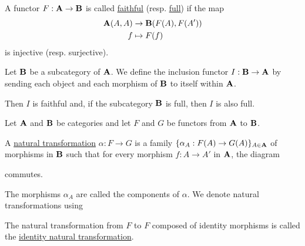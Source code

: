 \begin{definition}\label{def:faithful_full_functor}\cite[definition 1.2.16]{Leinster2014}
  A functor $F: \operatorname{\mathbf{A}} \to \operatorname{\mathbf{B}}$ is called \ul{faithful} (resp. \ul{full}) if the map
  \begin{align*}
    \operatorname{\mathbf{A}}(A, A) &\to \operatorname{\mathbf{B}}(F(A), F(A')) \\
    f &\mapsto F(f)
  \end{align*}
  is injective (resp. surjective).
\end{definition}

\begin{example}\label{def:subcategory_functors}\cite[25]{Leinster2014}
  Let $\operatorname{\mathbf{B}}$ be a subcategory of $\operatorname{\mathbf{A}}$. We define the inclusion functor $I: \operatorname{\mathbf{B}} \to \operatorname{\mathbf{A}}$ by sending each object and each morphism of $\operatorname{\mathbf{B}}$ to itself within $\operatorname{\mathbf{A}}$.

  Then $I$ is faithful and, if the subcategory $\operatorname{\mathbf{B}}$ is full, then $I$ is also full.
\end{example}

\begin{definition}\label{def:natural_transformation}\cite[definition 1.3.1]{Leinster2014}
  Let $\operatorname{\mathbf{A}}$ and $\operatorname{\mathbf{B}}$ be categories and let $F$ and $G$ be functors from $\operatorname{\mathbf{A}}$ to $\operatorname{\mathbf{B}}$.

  A \ul{natural transformation} $\alpha: F \to G$ is a family $\{ \alpha_A: F(A) \to G(A) \}_{A \in \operatorname{\mathbf{A}}}$ of morphisms in $\operatorname{\mathbf{B}}$ such that for every morphism $f: A \to A'$ in $\operatorname{\mathbf{A}}$, the diagram
  \begin{center}
  \end{center}
  commutes.

  The morphisms $\alpha_A$ are called the components of $\alpha$. We denote natural transformations using
  \begin{center}
  \end{center}

  The natural transformation from $F$ to $F$ composed of identity morphisms is called the \ul{identity natural transformation}.
\end{definition}

